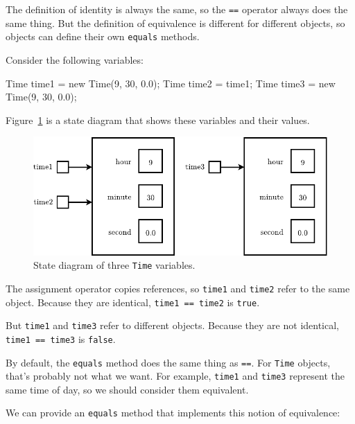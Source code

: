 \documentclass[12pt]{book}
\theoremstyle{exercise}
\newcommand{\java}[1]{\verb"#1"}
\begin{document}
The definition of identity is always the same, so the \java{==} operator always does the same thing.
But the definition of equivalence is different for different objects, so objects can define their own \java{equals} methods.

Consider the following variables:

\begin{code}
    Time time1 = new Time(9, 30, 0.0);
    Time time2 = time1;
    Time time3 = new Time(9, 30, 0.0);
\end{code}

Figure~\ref{fig.time2} is a state diagram that shows these variables and their values.


\begin{figure}
\begin{center}
\includegraphics{figs/time2.pdf}
\caption{State diagram of three \java{Time} variables.}
\label{fig.time2}
\end{center}
\end{figure}

The assignment operator copies references, so \java{time1} and \java{time2} refer to the same object.
Because they are identical, \java{time1 == time2} is \java{true}.

But \java{time1} and \java{time3} refer to different objects.
Because they are not identical, \java{time1 == time3} is \java{false}.

By default, the \java{equals} method does the same thing as \java{==}.
For \java{Time} objects, that's probably not what we want.
For example, \java{time1} and \java{time3} represent the same time of day, so we should consider them equivalent.


We can provide an \java{equals} method that implements this notion of equivalence:
\end{document}
